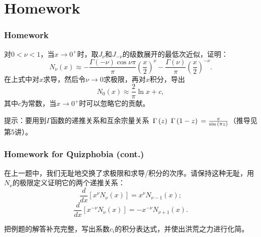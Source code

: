 \documentclass[CJK]{beamer}
\begin{document}
\section{Homework}

\begin{frame}
\frametitle{Homework}

\bitem
\item{对$0<\nu<1$，当$x\rightarrow 0^+$时，取$J_\nu$和$J_{-\nu}$的级数展开的最低次近似，证明：
  $$N_\nu(x) \approx -\frac{\Gamma(-\nu)\cos{\nu\pi}}{\pi}\left(\frac{x}{2}\right)^\nu - \frac{\Gamma(\nu)}{\pi}\left(\frac{x}{2}\right)^{-\nu}. $$
  在上式中对$x$求导，然后令$\nu\rightarrow 0$求极限，再对$x$积分，导出
  $$ N_0(x)\approx \frac{2}{\pi}\ln x + c,$$
  其中$c$为常数，当$x\rightarrow 0^+$时可以忽略它的贡献。

  \skiplines
      {\small \darkgreen 提示：要用到$\Gamma$函数的递推关系和互余宗量关系
        $\,\Gamma\left( z \right)\,\,\Gamma\left( 1-z \right)\,=\frac{\pi}{\sin{(\pi z)}}$（推导见第5讲）。}}
  \eitem

\end{frame}


\begin{frame}
\frametitle{Homework for Quizphobia (cont.)}
\bitem
\item{在上一题中，我们无耻地交换了求极限和求导/积分的次序。请保持这种无耻，用$N_\nu$的极限定义证明它的两个递推关系：
  $$ \frac{d}{dx}\left[x^\nu N_\nu(x)\right] = x^\nu N_{\nu -1}(x);$$
  $$ \frac{d}{dx}\left[x^{-\nu} N_\nu(x)\right] = -x^{-\nu} N_{\nu +1}(x).  $$
}
\item{把例题的解答补充完整，写出系数$c_i$的积分表达式，并使出洪荒之力进行化简。}  \eitem
\end{frame}

\ech
\end{document}
